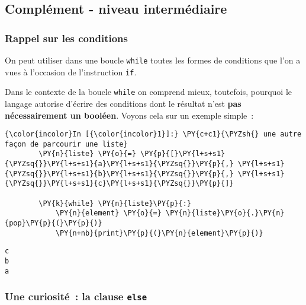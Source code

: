     \hypertarget{compluxe9ment---niveau-intermuxe9diaire}{%
\subsection{Complément - niveau
intermédiaire}\label{compluxe9ment---niveau-intermuxe9diaire}}

    \hypertarget{rappel-sur-les-conditions}{%
\subsubsection{Rappel sur les
conditions}\label{rappel-sur-les-conditions}}

    On peut utiliser dans une boucle \texttt{while} toutes les formes de
conditions que l'on a vues à l'occasion de l'instruction \texttt{if}.

Dans le contexte de la boucle \texttt{while} on comprend mieux,
toutefois, pourquoi le langage autorise d'écrire des conditions dont le
résultat n'est \textbf{pas nécessairement un booléen}. Voyons cela sur
un exemple simple~:

    \begin{Verbatim}[commandchars=\\\{\}]
{\color{incolor}In [{\color{incolor}1}]:} \PY{c+c1}{\PYZsh{} une autre façon de parcourir une liste}
        \PY{n}{liste} \PY{o}{=} \PY{p}{[}\PY{l+s+s1}{\PYZsq{}}\PY{l+s+s1}{a}\PY{l+s+s1}{\PYZsq{}}\PY{p}{,} \PY{l+s+s1}{\PYZsq{}}\PY{l+s+s1}{b}\PY{l+s+s1}{\PYZsq{}}\PY{p}{,} \PY{l+s+s1}{\PYZsq{}}\PY{l+s+s1}{c}\PY{l+s+s1}{\PYZsq{}}\PY{p}{]}
        
        \PY{k}{while} \PY{n}{liste}\PY{p}{:}
            \PY{n}{element} \PY{o}{=} \PY{n}{liste}\PY{o}{.}\PY{n}{pop}\PY{p}{(}\PY{p}{)}
            \PY{n+nb}{print}\PY{p}{(}\PY{n}{element}\PY{p}{)}
\end{Verbatim}


    \begin{Verbatim}[commandchars=\\\{\}]
c
b
a

    \end{Verbatim}

    \hypertarget{une-curiosituxe9-la-clause-else}{%
\subsubsection{\texorpdfstring{Une curiosité~: la clause
\texttt{else}}{Une curiosité~: la clause else}}\label{une-curiosituxe9-la-clause-else}}

